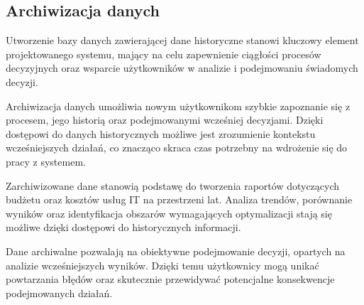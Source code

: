 \subsection{Archiwizacja danych}
Utworzenie bazy danych zawierającej dane historyczne stanowi kluczowy element projektowanego systemu, mający na celu zapewnienie ciągłości procesów decyzyjnych oraz wsparcie użytkowników w analizie i podejmowaniu świadomych decyzji. 

Archiwizacja danych umożliwia nowym użytkownikom szybkie zapoznanie się z procesem, jego historią oraz podejmowanymi wcześniej decyzjami. Dzięki dostępowi do danych historycznych możliwe jest zrozumienie kontekstu wcześniejszych działań, co znacząco skraca czas potrzebny na wdrożenie się do pracy z systemem.

Zarchiwizowane dane stanowią podstawę do tworzenia raportów dotyczących budżetu oraz kosztów usług IT na przestrzeni lat. Analiza trendów, porównanie wyników oraz identyfikacja obszarów wymagających optymalizacji stają się możliwe dzięki dostępowi do historycznych informacji.

Dane archiwalne pozwalają na obiektywne podejmowanie decyzji, opartych na analizie wcześniejszych wyników. Dzięki temu użytkownicy mogą unikać powtarzania błędów oraz skutecznie przewidywać potencjalne konsekwencje podejmowanych działań.